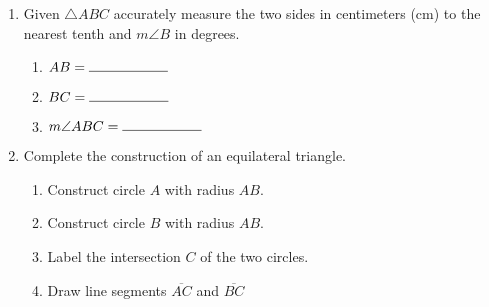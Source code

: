 \documentclass[12pt, oneside]{article}
\begin{document}
\begin{enumerate}
\newpage
  \item Given $\triangle ABC$ accurately measure the two sides in centimeters (cm) to the nearest tenth and $m \angle B$ in degrees.
    \bigskip
  \begin{enumerate}
    \item $AB= \rule{2cm}{0.15mm}$ \bigskip
    \item $BC= \rule{2cm}{0.15mm}$ \bigskip
    \item $m \angle ABC= \rule{2cm}{0.15mm}$
  \end{enumerate}
  \begin{center}
  \end{center}


  \item Complete the construction of an equilateral triangle.
  \begin{enumerate}
    \item Construct circle $A$ with radius $AB$.
    \item Construct circle $B$ with radius $AB$.
    \item Label the intersection $C$ of the two circles.
    \item Draw line segments $\overline{AC}$ and $\overline{BC}$
  \end{enumerate}
  \vspace{4cm}
  \begin{center}
  \end{center}

  \end{enumerate}

\newpage
\end{document}
